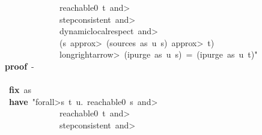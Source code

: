 \documentclass{article}
\newcommand{\syntaxKEYWORDA}[1]{\textcolor[rgb]{0.0,0.4,0.6}{\textbf{#1}}}
\newcommand{\syntaxKEYWORDC}[1]{\textcolor[rgb]{0.0,0.6,1.0}{\textbf{#1}}}
\newcommand{\syntaxLITERALA}[1]{\textcolor[rgb]{1.0,0.0,0.8}{#1}}
\newcommand{\syntaxKEYWORDA}[1]{\textcolor[rgb]{0.0,0.4,0.6}{\textbf{#1}}}
\newcommand{\syntaxKEYWORDC}[1]{\textcolor[rgb]{0.0,0.6,1.0}{\textbf{#1}}}
\newcommand{\syntaxLITERALA}[1]{\textcolor[rgb]{1.0,0.0,0.8}{#1}}
\newcommand{\syntaxKEYWORDA}[1]{\textcolor[rgb]{0.0,0.4,0.6}{\textbf{#1}}}
\newcommand{\syntaxKEYWORDC}[1]{\textcolor[rgb]{0.0,0.6,1.0}{\textbf{#1}}}
\newcommand{\syntaxLITERALA}[1]{\textcolor[rgb]{1.0,0.0,0.8}{#1}}
\newcommand{\syntaxKEYWORDA}[1]{\textcolor[rgb]{0.0,0.4,0.6}{#1}}
\newcommand{\syntaxKEYWORDC}[1]{\textcolor[rgb]{0.0,0.6,1.0}{#1}}
\newcommand{\syntaxLITERALA}[1]{\textcolor[rgb]{1.0,0.0,0.8}{\textbf{#1}}}
\newcommand{\syntaxKEYWORDA}[1]{\textcolor[rgb]{0.0,0.4,0.6}{\textbf{#1}}}
\newcommand{\syntaxKEYWORDC}[1]{\textcolor[rgb]{0.0,0.6,1.0}{\textbf{#1}}}
\newcommand{\syntaxLITERALA}[1]{\textcolor[rgb]{1.0,0.0,0.8}{#1}}
\newcommand{\syntaxKEYWORDA}[1]{\textcolor[rgb]{0.0,0.4,0.6}{\textbf{#1}}}
\newcommand{\syntaxKEYWORDC}[1]{\textcolor[rgb]{0.0,0.6,1.0}{\textbf{#1}}}
\newcommand{\syntaxLITERALA}[1]{\textcolor[rgb]{1.0,0.0,0.8}{#1}}
\begin{document}
\syntaxLITERALA{{\ }{\ }{\ }{\ }{\ }{\ }{\ }{\ }{\ }{\ }{\ }{\ }{\ }{\ }{\ }{\ }{\ }{\ }{\ }{\ }reachable0{\ }t{\ }\<and>}\hspace*{\fill}\\
\syntaxLITERALA{{\ }{\ }{\ }{\ }{\ }{\ }{\ }{\ }{\ }{\ }{\ }{\ }{\ }{\ }{\ }{\ }{\ }{\ }{\ }{\ }step\usebox{\underscorebox}consistent{\ }\<and>}\hspace*{\fill}\\
\syntaxLITERALA{{\ }{\ }{\ }{\ }{\ }{\ }{\ }{\ }{\ }{\ }{\ }{\ }{\ }{\ }{\ }{\ }{\ }{\ }{\ }{\ }dynamic\usebox{\underscorebox}local\usebox{\underscorebox}respect{\ }\<and>}\hspace*{\fill}\\
\syntaxLITERALA{{\ }{\ }{\ }{\ }{\ }{\ }{\ }{\ }{\ }{\ }{\ }{\ }{\ }{\ }{\ }{\ }{\ }{\ }{\ }{\ }(s{\ }\<approx>{\ }(sources{\ }as{\ }u{\ }s){\ }\<approx>{\ }t)}\hspace*{\fill}\\
\syntaxLITERALA{{\ }{\ }{\ }{\ }{\ }{\ }{\ }{\ }{\ }{\ }{\ }{\ }{\ }{\ }{\ }{\ }{\ }{\ }{\ }{\ }\<longrightarrow>{\ }(ipurge{\ }as{\ }u{\ }s){\ }={\ }(ipurge{\ }as{\ }u{\ }t)"}\hspace*{\fill}\\
{\ }{\ }{\ }{\ }{\ }{\ }{\ }\syntaxKEYWORDA{proof}{\ }{-}{\ }{\ }{\ }{\ }{\ }{\ }{\ }{\ }{\ }{\ }{\ }{\ }{\ }{\ }{\ }{\ }{\ }{\ }{\ }{\ }{\ }{\ }{\ }{\ }{\ }{\ }{\ }{\ }{\ }{\ }{\ }{\ }{\ }{\ }{\ }{\ }{\ }{\ }{\ }{\ }{\ }{\ }{\ }{\ }{\ }{\ }{\ }\hspace*{\fill}\\
{\ }{\ }{\ }{\ }{\ }{\ }{\ }\syntaxKEYWORDA{\usebox{\opencurlybracket}}\hspace*{\fill}\\
{\ }{\ }{\ }{\ }{\ }{\ }{\ }{\ }\syntaxKEYWORDC{fix}{\ }as\hspace*{\fill}\\
{\ }{\ }{\ }{\ }{\ }{\ }{\ }{\ }\syntaxKEYWORDA{have}{\ }\syntaxLITERALA{"\<forall>s{\ }t{\ }u.{\ }reachable0{\ }s{\ }\<and>}\hspace*{\fill}\\
\syntaxLITERALA{{\ }{\ }{\ }{\ }{\ }{\ }{\ }{\ }{\ }{\ }{\ }{\ }{\ }{\ }{\ }{\ }{\ }{\ }{\ }{\ }reachable0{\ }t{\ }\<and>}\hspace*{\fill}\\
\syntaxLITERALA{{\ }{\ }{\ }{\ }{\ }{\ }{\ }{\ }{\ }{\ }{\ }{\ }{\ }{\ }{\ }{\ }{\ }{\ }{\ }{\ }step\usebox{\underscorebox}consistent{\ }\<and>}\hspace*{\fill}\\
\end{document}
